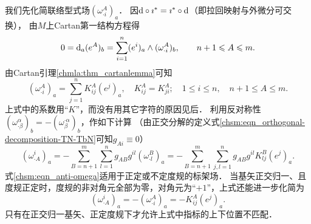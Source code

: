 我们先化简联络型式场$(\omega _{\cdot i}^A)_a$．
因${\rm d}\circ \imath^* = \imath^* \circ {\rm d}$（即拉回映射与外微分可交换），
由$M$上Cartan第一结构方程得
\begin{equation}
    0 ={\rm d}_a(e^A)_b=\sum_{i=1}^{n}(e^i)_a \wedge (\omega _{\cdot i}^A)_b ,
    \qquad  n+1 \leqslant A \leqslant m .
\end{equation}
由Cartan引理\ref{chmla:thm_cartanlemma}可知
\begin{equation}\label{chsm:eqn_omega-Kija}
    (\omega _{\cdot i}^A)_a= \sum_{j=1}^{n} K^{A}_{ij}(e^j)_a, \quad K^{A}_{ij}=K^{A}_{ji};
    \quad 1 \leqslant i \leqslant n,\quad  n+1 \leqslant A \leqslant m .
\end{equation}
上式中的系数用“$K$”，而没有用其它字符的原因见后．
利用反对称性$(\omega _{\cdot \beta}^\alpha)_b =-(\omega _{\beta}^{\cdot \alpha})_b$，作如下计算
（由正交分解的定义式\eqref{chsm:eqn_orthogonal-decomposition-TN-TbN}可知$g_{A i}\equiv 0$）
\begin{equation}\label{chsm:eqn_anti-omega}
    (\omega _{\cdot A}^i)_a
    = -\sum_{B=n+1}^{m}\sum_{l=1}^{n}g_{A B} g^{il} (\omega _{\cdot l}^B)_a
    = -\sum_{B=n+1}^{m}\sum_{j,l=1}^{n}g_{A B} g^{il} K_{lj}^B (e^j)_a .
\end{equation}
式\eqref{chsm:eqn_anti-omega}适用于正定或不定度规的标架场．
当基矢正交归一、且度规正定时，度规的非对角元全部为零，对角元为“$+1$”，上式还能进一步化简为
\begin{equation}\label{chsm:eqn_anti-omega-positive}
    (\omega _{\cdot A}^i)_a= -(\omega _{\cdot i}^A)_a
    = -K_{ij}^A (e^j)_a .
\end{equation}
只有在正交归一基矢、正定度规下才允许上式中指标的上下位置不匹配．


